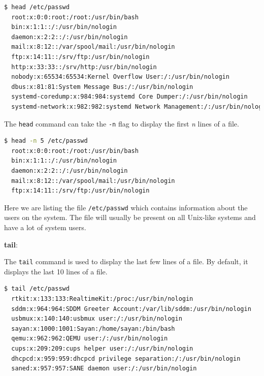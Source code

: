 \begin{lstlisting}[language=bash]
  $ head /etc/passwd
  root:x:0:0:root:/root:/usr/bin/bash
  bin:x:1:1::/:/usr/bin/nologin
  daemon:x:2:2::/:/usr/bin/nologin
  mail:x:8:12::/var/spool/mail:/usr/bin/nologin
  ftp:x:14:11::/srv/ftp:/usr/bin/nologin
  http:x:33:33::/srv/http:/usr/bin/nologin
  nobody:x:65534:65534:Kernel Overflow User:/:/usr/bin/nologin
  dbus:x:81:81:System Message Bus:/:/usr/bin/nologin
  systemd-coredump:x:984:984:systemd Core Dumper:/:/usr/bin/nologin
  systemd-network:x:982:982:systemd Network Management:/:/usr/bin/nologin
\end{lstlisting}

The \texttt{head} command can take the \texttt{-n} flag to display the first \textit{n} lines of a file.

\begin{lstlisting}[language=bash]
  $ head -n 5 /etc/passwd
  root:x:0:0:root:/root:/usr/bin/bash
  bin:x:1:1::/:/usr/bin/nologin
  daemon:x:2:2::/:/usr/bin/nologin
  mail:x:8:12::/var/spool/mail:/usr/bin/nologin
  ftp:x:14:11::/srv/ftp:/usr/bin/nologin
\end{lstlisting}

\begin{remark}
  Here we are listing the file \texttt{/etc/passwd} which contains information about the users on the system.
  The file will usually be present on all Unix-like systems and have a lot of system users.
\end{remark}

\textbf{tail}:

The \texttt{tail} command is used to display the last few lines of a file.
By default, it displays the last 10 lines of a file.

\begin{lstlisting}[language=bash]
  $ tail /etc/passwd
  rtkit:x:133:133:RealtimeKit:/proc:/usr/bin/nologin
  sddm:x:964:964:SDDM Greeter Account:/var/lib/sddm:/usr/bin/nologin
  usbmux:x:140:140:usbmux user:/:/usr/bin/nologin
  sayan:x:1000:1001:Sayan:/home/sayan:/bin/bash
  qemu:x:962:962:QEMU user:/:/usr/bin/nologin
  cups:x:209:209:cups helper user:/:/usr/bin/nologin
  dhcpcd:x:959:959:dhcpcd privilege separation:/:/usr/bin/nologin
  saned:x:957:957:SANE daemon user:/:/usr/bin/nologin
\end{lstlisting}

